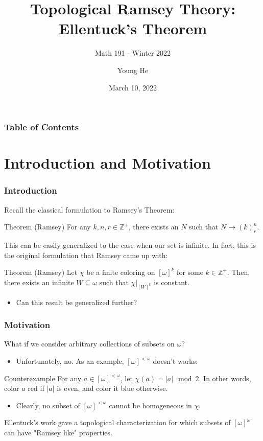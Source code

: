 \documentclass[handout]{beamer}
\title{Topological Ramsey Theory: Ellentuck's Theorem}
\subtitle{Math 191 - Winter 2022}
\author{Young He}
\institute
{
  Department of Mathematics\\
  University of California, Los Angeles
}
\date{March 10, 2022}
\begin{document}
\frame{\titlepage}
\begin{frame}
\frametitle{Table of Contents}
\tableofcontents
\end{frame}

\section{Introduction and Motivation}
\begin{frame}
\frametitle{Introduction}
Recall the classical formulation to Ramsey's Theorem: 
\begin{alertblock}{Theorem (Ramsey)}
For any $k,n,r\in\mathbb{Z}^+$, there exists an $N$ such that $N \rightarrow (k)^n_r$. 
\end{alertblock} \pause
This can be easily generalized to the case when our set is infinite. In fact, this is the original formulation that Ramsey came up with\footnotemark: 
\begin{alertblock}{Theorem (Ramsey)}
Let $\chi$ be a finite coloring on $[\omega]^k$ for some $k\in\mathbb{Z}^+$. Then, there exists an infinite $W\subseteq\omega$ such that $\chi|_{[W]^k}$ is constant. 
\end{alertblock} \pause
\begin{itemize}
    \item Can this result be generalized further? 
\end{itemize}
\end{frame}

\begin{frame}
\frametitle{Motivation}
What if we consider arbitrary collections of subsets on $\omega$? \pause
\begin{itemize}
    \item<1-> Unfortunately, no. As an example, $[\omega]^{<\omega}$ doesn't works: 
\end{itemize}
\begin{exampleblock}{Counterexample}
For any $a\in[\omega]^{<\omega}$, let $\chi(a)=|a|\mod 2$. In other words, color $a$ red if $|a|$ is even, and color it blue otherwise.  
\end{exampleblock} \pause
\begin{itemize}
    \item Clearly, no subset of $[\omega]^{<\omega}$ cannot be homogeneous in $\chi$. 
\end{itemize} \pause
Ellentuck's work gave a topological characterization for which subsets of $[\omega]^\omega$ can have "Ramsey like" properties. 
\end{frame}
\end{document}
